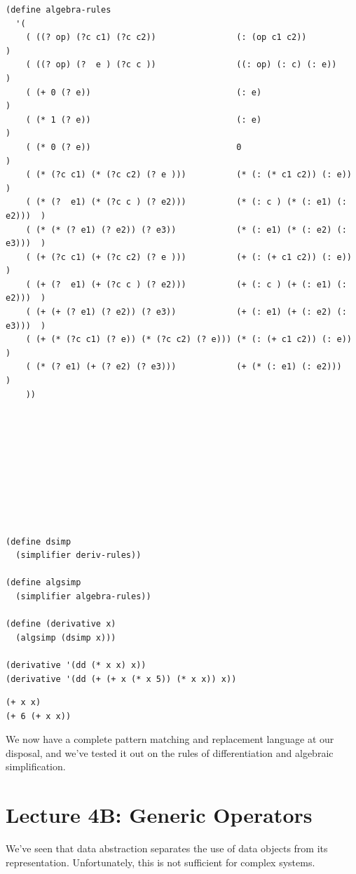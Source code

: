 \documentclass[9pt]{report}
\begin{document}
\begin{verbatim}
(define algebra-rules
  '(
    ( ((? op) (?c c1) (?c c2))                (: (op c1 c2))                )
    ( ((? op) (?  e ) (?c c ))                ((: op) (: c) (: e))          )
    ( (+ 0 (? e))                             (: e)                         )
    ( (* 1 (? e))                             (: e)                         )
    ( (* 0 (? e))                             0                             )
    ( (* (?c c1) (* (?c c2) (? e )))          (* (: (* c1 c2)) (: e))       )
    ( (* (?  e1) (* (?c c ) (? e2)))          (* (: c ) (* (: e1) (: e2)))  )
    ( (* (* (? e1) (? e2)) (? e3))            (* (: e1) (* (: e2) (: e3)))  )
    ( (+ (?c c1) (+ (?c c2) (? e )))          (+ (: (+ c1 c2)) (: e))       )
    ( (+ (?  e1) (+ (?c c ) (? e2)))          (+ (: c ) (+ (: e1) (: e2)))  )
    ( (+ (+ (? e1) (? e2)) (? e3))            (+ (: e1) (+ (: e2) (: e3)))  )
    ( (+ (* (?c c1) (? e)) (* (?c c2) (? e))) (* (: (+ c1 c2)) (: e))       )
    ( (* (? e1) (+ (? e2) (? e3)))            (+ (* (: e1) (: e2)))         )
    ))
\end{verbatim}

\begin{verbatim}









(define dsimp
  (simplifier deriv-rules))

(define algsimp
  (simplifier algebra-rules))

(define (derivative x)
  (algsimp (dsimp x)))

(derivative '(dd (* x x) x))
(derivative '(dd (+ (+ x (* x 5)) (* x x)) x))
\end{verbatim}

\begin{verbatim}
(+ x x)
(+ 6 (+ x x))
\end{verbatim}


We now have a complete pattern matching and replacement language at
our disposal, and we've tested it out on the rules of
differentiation and algebraic simplification.

\chapter{Lecture 4B: Generic Operators}
\label{sec:org72afd59}

We've seen that data abstraction separates the use of data objects
from its representation. Unfortunately, this is not sufficient for
complex systems.
\end{document}
